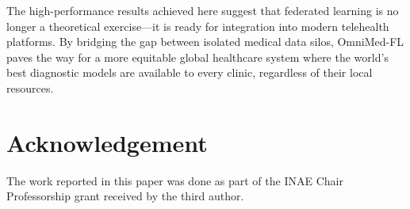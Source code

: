 \documentclass[letterpaper, conference]{IEEEtran}
\begin{document}
The high-performance results achieved here suggest that federated learning is no longer a theoretical exercise---it is ready for integration into modern telehealth platforms. By bridging the gap between isolated medical data silos, OmniMed-FL paves the way for a more equitable global healthcare system where the world's best diagnostic models are available to every clinic, regardless of their local resources.

\FloatBarrier

\let\oldbibliography\thebibliography
\renewcommand{\thebibliography}[1]{%
  \oldbibliography{#1}%
  \footnotesize
  \setlength{\itemsep}{0pt}%
  \setlength{\parskip}{0pt}%
  \setlength{\topsep}{0pt}%
}

\section{Acknowledgement}
The work reported in this paper was done as part of the INAE Chair Professorship grant received by the third author.
\end{document}
